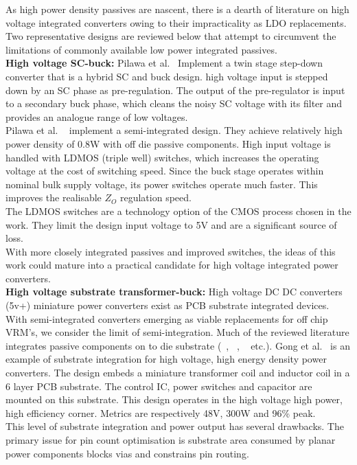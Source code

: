 \documentclass[letterpaper,twocolumn,10pt]{article}
\begin{document}
\indent As high power density passives are nascent, there is a dearth of literature on high voltage integrated converters owing to their impracticality as LDO replacements. Two representative designs are reviewed below that attempt to circumvent the limitations of commonly available low power integrated passives.\\
\textbf{High voltage SC-buck: }Pilawa et al.~\cite{Pilawa2012} Implement a twin stage step-down converter that is a hybrid SC and buck design. high voltage input is stepped down by an SC phase as pre-regulation. The output of the pre-regulator is input to a secondary buck phase, which cleans the noisy SC voltage with its filter and provides an analogue range of low voltages.\\
Pilawa et al. ~\cite{Pilawa2012} implement a semi-integrated design. They achieve relatively high power density of 0.8W with off die passive components. High input voltage is handled with LDMOS (triple well) switches, which increases the operating voltage at the cost of switching speed. Since the buck stage operates within nominal bulk supply voltage, its power switches operate much faster. This improves the realisable $Z_O$ regulation speed.\\
The LDMOS switches are a technology option of the CMOS process chosen in the work. They limit the design input voltage to 5V and are a significant source of loss.\\
With more closely integrated passives and improved switches, the ideas of this work could mature into a practical candidate for high voltage integrated power converters.\\
\textbf{High voltage substrate transformer-buck: }High voltage DC DC converters (5v+) miniature power converters exist as PCB substrate integrated devices. With semi-integrated converters emerging as viable replacements for off chip VRM's, we consider the limit of semi-integration. Much of the reviewed literature integrates passive components on to die substrate (~\cite{Pilawa2012}, ~\cite{Bathily2012}, ~\cite{Ng2012} etc.). Gong et al.~\cite{Gong2008} is an example of substrate integration for high voltage, high energy density power converters. The design embeds a miniature transformer coil and inductor coil in a 6 layer PCB substrate. The control IC, power switches and capacitor are mounted on this substrate. This design operates in the high voltage high power, high efficiency corner. Metrics are respectively 48V, 300W and 96\% peak.\\
This level of substrate integration and power output has several drawbacks. The primary issue for pin count optimisation is substrate area consumed by planar power components blocks vias and constrains pin routing.\\
\end{document}
